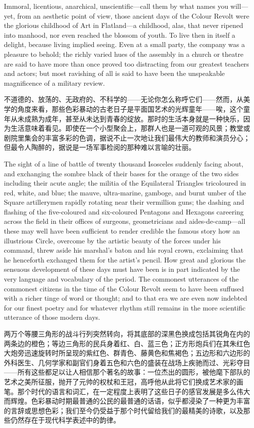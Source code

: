 \documentclass[12pt,UTF8]{ctexbook}
\begin{document}
Immoral, licentious, anarchical, unscientific---call them by what names you will---yet, from an aesthetic point of view, those ancient days of the Colour Revolt were the glorious childhood of Art in Flatland---a childhood, alas, that never ripened into manhood, nor even reached the blossom of youth. To live then in itself a delight, because living implied seeing. Even at a small party, the company was a pleasure to behold; the richly varied hues of the assembly in a church or theatre are said to have more than once proved too distracting from our greatest teachers and actors; but most ravishing of all is said to have been the unspeakable magnificence of a military review.

不道德的、放荡的、无政府的、不科学的——无论你怎么称呼它们——然而，从美学的角度来看，那些色彩暴动的古老日子是平面国艺术的光辉童年——唉，这个童年从未成熟为成年，甚至从未达到青春的绽放。那时的生活本身就是一种快乐，因为生活意味着看见。即使在一个小型聚会上，那群人也是一道可观的风景；教堂或剧院里集会的丰富多彩的色调，据说不止一次地让我们最伟大的教师和演员分心；但最令人陶醉的，据说是一场军事检阅的那种难以言喻的壮丽。

The sight of a line of battle of twenty thousand Isosceles suddenly facing about, and exchanging the sombre black of their bases for the orange of the two sides including their acute angle; the militia of the Equilateral Triangles tricoloured in red, white, and blue; the mauve, ultra-marine, gamboge, and burnt umber of the Square artillerymen rapidly rotating near their vermillion guns; the dashing and flashing of the five-coloured and six-coloured Pentagons and Hexagons careering across the field in their offices of surgeons, geometricians and aides-de-camp---all these may well have been sufficient to render credible the famous story how an illustrious Circle, overcome by the artistic beauty of the forces under his command, threw aside his marshal's baton and his royal crown, exclaiming that he henceforth exchanged them for the artist's pencil. How great and glorious the sensuous development of these days must have been is in part indicated by the very language and vocabulary of the period. The commonest utterances of the commonest citizens in the time of the Colour Revolt seem to have been suffused with a richer tinge of word or thought; and to that era we are even now indebted for our finest poetry and for whatever rhythm still remains in the more scientific utterance of those modern days.

两万个等腰三角形的战斗行列突然转向，将其底部的深黑色换成包括其锐角在内的两条边的橙色；等边三角形的民兵身着红、白、蓝三色；正方形炮兵们在其朱红色大炮旁迅速旋转时所呈现的紫红色、群青色、藤黄色和焦褐色；五边形和六边形的外科医生、几何学家和副官们身着五色和六色的盛装在战场上疾驰而过、光彩夺目——所有这些都足以让人相信那个著名的故事：一位杰出的圆形，被他麾下部队的艺术之美所征服，抛开了元帅的权杖和王冠，高呼他从此将它们换成艺术家的画笔。那个时代的语言和词汇，在一定程度上表明了这些日子的感官发展是多么伟大而辉煌。色彩暴动时期最普通的公民的最普通的话语，似乎都浸染了一种更为丰富的言辞或思想色彩；我们至今仍受益于那个时代留给我们的最精美的诗歌，以及那些仍然存在于现代科学表述中的韵律。
\end{document}
